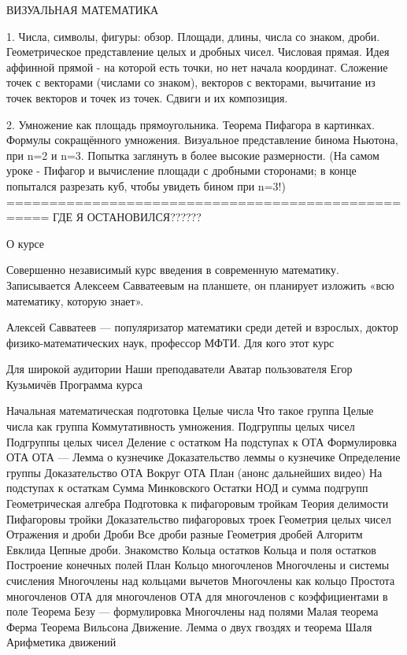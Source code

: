 ВИЗУАЛЬНАЯ МАТЕМАТИКА

1. Числа, символы, фигуры: обзор. Площади, длины, числа со знаком, дроби. 
Геометрическое представление целых и дробных чисел. Числовая прямая.
Идея аффинной прямой - на которой есть точки, но нет начала координат.
Сложение точек с векторами (числами со знаком), векторов с векторами,
вычитание из точек векторов и точек из точек. Сдвиги и их композиция.

2. Умножение как площадь прямоугольника. Теорема Пифагора в картинках.
Формулы сокращённого умножения. Визуальное представление бинома
Ньютона, при n=2 и n=3. Попытка заглянуть в более высокие размерности.
(На самом уроке - Пифагор и вычисление площади с дробными сторонами;
в конце попытался разрезать куб, чтобы увидеть бином при n=3!)
===================================================
ГДЕ Я ОСТАНОВИЛСЯ??????

О курсе

Совершенно независимый курс введения в современную математику. Записывается Алексеем Савватеевым на планшете, он планирует изложить «всю математику, которую знает».

Алексей Савватеев — популяризатор математики среди детей и взрослых, доктор физико-математических наук, профессор МФТИ.
Для кого этот курс

Для широкой аудитории
Наши преподаватели
Аватар пользователя
Егор Кузьмичёв
Программа курса

    Начальная математическая подготовка
    Целые числа
    Что такое группа
    Целые числа как группа
    Коммутативность умножения. Подгруппы целых чисел
    Подгруппы целых чисел
    Деление с остатком
    На подступах к ОТА
    Формулировка ОТА
    ОТА — Лемма о кузнечике
    Доказательство леммы о кузнечике
    Определение группы
    Доказательство ОТА
    Вокруг ОТА
    План (анонс дальнейших видео)
    На подступах к остаткам
    Сумма Минковского
    Остатки
    НОД и сумма подгрупп
    Геометрическая алгебра
    Подготовка к пифагоровым тройкам
    Теория делимости
    Пифагоровы тройки
    Доказательство пифагоровых троек
    Геометрия целых чисел
    Отражения и дроби
    Дроби
    Все дроби разные
    Геометрия дробей
    Алгоритм Евклида
    Цепные дроби. Знакомство
    Кольца остатков
    Кольца и поля остатков
    Построение конечных полей
    План
    Кольцо многочленов
    Многочлены и системы счисления
    Многочлены над кольцами вычетов
    Многочлены как кольцо
    Простота многочленов
    ОТА для многочленов
    ОТА для многочленов с коэффициентами в поле
    Теорема Безу — формулировка
    Многочлены над полями
    Малая теорема Ферма
    Теорема Вильсона
    Движение. Лемма о двух гвоздях и теорема Шаля
    Арифметика движений

